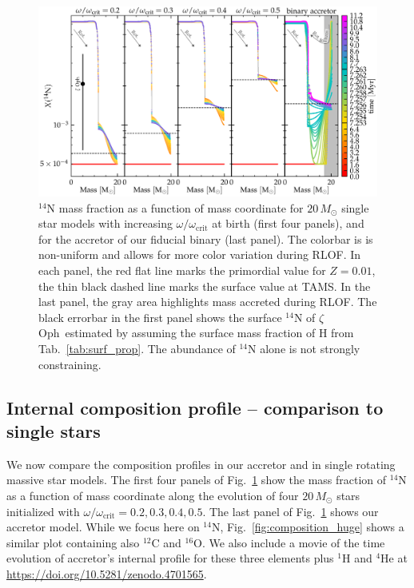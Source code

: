 \documentclass[twocolumn,twocolappendix,trackchanges]{aastex63}
\DeclareRobustCommand{\Figref}[1]{Fig.~\ref{#1}}
\DeclareRobustCommand{\Tabref}[1]{Tab.~\ref{#1}}
\newcommand{\zoph}{$\zeta$ Oph}
\begin{document}
\begin{figure}[tbp]
  \centering
  \includegraphics[width=\textwidth]{n14_colored} %
  \caption{$^{14}\mathrm{N}$ mass fraction as a function of mass
    coordinate for $20\,M_\odot$ single star models with increasing
    $\omega/\omega_\mathrm{crit}$ at birth (first four panels), and
    for the accretor of our fiducial binary (last panel). The colorbar
    is is non-uniform and allows for more color variation during
    RLOF. In each
    panel, the red flat line marks the primordial value for
    $Z=0.01$, the thin black dashed line marks the surface value at TAMS. In
    the last panel, the gray area highlights mass accreted during
    RLOF. The black errorbar in the first panel shows the surface
    $^{14}\mathrm{N}$ of \zoph\ estimated by  assuming
    the surface mass fraction of H from \Tabref{tab:surf_prop}. The
    abundance of $^{14}\mathrm{N}$ alone is not strongly
    constraining.
  }
  \label{fig:n14}
\end{figure}

\subsection{Internal composition profile -- comparison to single stars}
\label{sec:mix_comparison_single}

We now compare the composition profiles in our accretor and in single
rotating massive star models. The first four panels of
\Figref{fig:n14} show the mass fraction of $^{14}\mathrm{N}$ as a
function of mass coordinate along the evolution of four $20\,M_\odot$
stars initialized with $\omega/\omega_\mathrm{crit}=0.2,0.3,0.4,0.5$.
The last panel of \Figref{fig:n14} shows our accretor model. While we
focus here on $^{14}\mathrm{N}$, \Figref{fig:composition_huge} shows a
similar plot containing also $^{12}\mathrm{C}$ and
$^{16}\mathrm{O}$. We also include a movie of the time evolution of
accretor's internal profile for these three elements plus
$^1\mathrm{H}$ and $^4\mathrm{He}$ at
\url{https://doi.org/10.5281/zenodo.4701565}.
\end{document}
